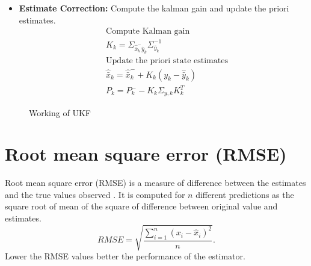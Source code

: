 \begin{itemize}
\begin{itemize}
        \item \textbf{Estimate Correction:} Compute the kalman gain and update the priori estimates.
        \begin{equation}
        \begin{split}
        &\text{Compute Kalman gain}\\
        &K_k = \Sigma_{\hat{\bar x}_k^- \hat y_k} \Sigma_{\hat y_k}^{-1}\\
        &\text{Update the priori state estimates}\\
        &\hat{\bar{x}}_k = \hat{\bar{x}}_k^- + K_k(y_k - \hat{\bar y}_k)\\
        &P_k = P_k^- - K_k \Sigma_{y,k} K_k^T
        \end{split}
        \end{equation}
    \end{itemize}
\end{itemize}
\begin{figure}  

\caption{Working of UKF}
\label{fig:ukf_blk}
\end{figure}

\section{Root mean square error (RMSE)}
Root mean square error (RMSE) is a measure of difference between the estimates and the true values observed \citep{hyn06}. It is computed for $n$ different predictions as the square root of mean of the square of difference between original value and estimates.
\begin{equation}
    \label{eq:rmse}
    RMSE = \sqrt{\frac{\sum_{i=1}^n (x_i - \hat x_i)^2}{n}}.
\end{equation}
Lower the RMSE values better the performance of the estimator.
